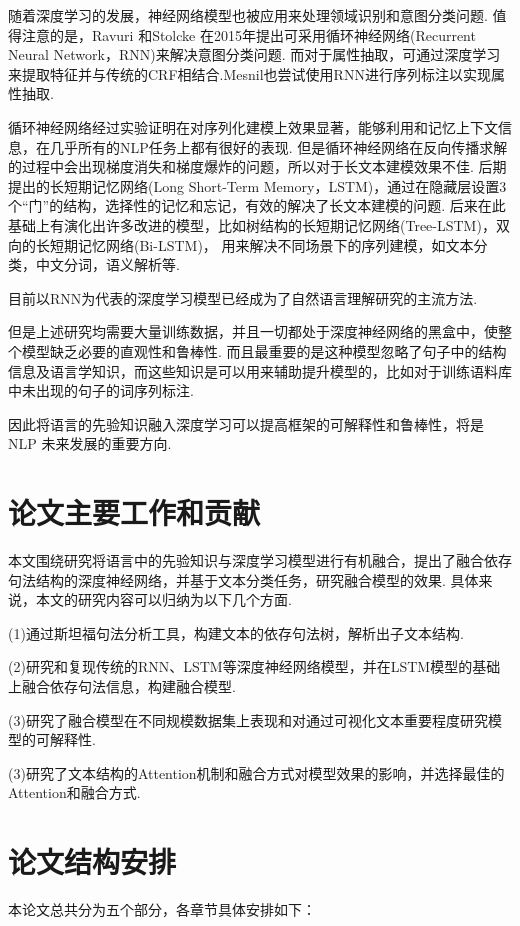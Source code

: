 \documentclass[bachelor,winfonts]{jnuthesis}
\begin{document}
随着深度学习的发展，神经网络模型也被应用来处理领域识别和意图分类问题.
值得注意的是，Ravuri 和Stolcke 在2015年提出可采用循环神经网络(Recurrent Neural Network，RNN)来解决意图分类问题.
而对于属性抽取，可通过深度学习来提取特征并与传统的CRF相结合.Mesnil也尝试使用RNN进行序列标注以实现属性抽取\cite{Mesnil2013Investigation}.

循环神经网络经过实验证明在对序列化建模上效果显著，能够利用和记忆上下文信息，在几乎所有的NLP任务上都有很好的表现.
但是循环神经网络在反向传播求解的过程中会出现梯度消失和梯度爆炸的问题，所以对于长文本建模效果不佳.
后期提出的长短期记忆网络\cite{Graves2012Long}(Long Short-Term Memory，LSTM)，通过在隐藏层设置3个“门”的结构，选择性的记忆和忘记，有效的解决了长文本建模的问题.
后来在此基础上有演化出许多改进的模型，比如树结构的长短期记忆网络\cite{Tai2015Improved}(Tree-LSTM)，双向的长短期记忆网络\cite{Bahdanau2014Neural}(Bi-LSTM)，
用来解决不同场景下的序列建模，如文本分类，中文分词，语义解析等.

目前以RNN为代表的深度学习模型已经成为了自然语言理解研究的主流方法.

但是上述研究均需要大量训练数据，并且一切都处于深度神经网络的黑盒中，使整个模型缺乏必要的直观性和鲁棒性.
而且最重要的是这种模型忽略了句子中的结构信息及语言学知识，而这些知识是可以用来辅助提升模型的，比如对于训练语料库中未出现的句子的词序列标注.

因此将语言的先验知识融入深度学习可以提高框架的可解释性和鲁棒性，将是 NLP 未来发展的重要方向.



\section{论文主要工作和贡献}
本文围绕研究将语言中的先验知识与深度学习模型进行有机融合，提出了融合依存句法结构的深度神经网络，并基于文本分类任务，研究融合模型的效果.
具体来说，本文的研究内容可以归纳为以下几个方面.

(1)通过斯坦福句法分析工具，构建文本的依存句法树，解析出子文本结构.

(2)研究和复现传统的RNN、LSTM等深度神经网络模型，并在LSTM模型的基础上融合依存句法信息，构建融合模型.

(3)研究了融合模型在不同规模数据集上表现和对通过可视化文本重要程度研究模型的可解释性.

(3)研究了文本结构的Attention机制和融合方式对模型效果的影响，并选择最佳的Attention和融合方式.

\section{论文结构安排}
本论文总共分为五个部分，各章节具体安排如下：
\end{document}
